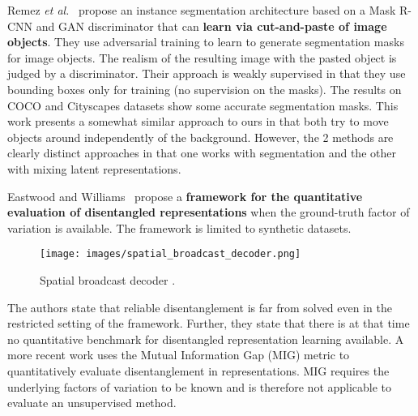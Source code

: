 \documentclass[a4paper,12pt]{report}
\begin{document}
Remez \textit{et al.}~\cite{CutAndPaste} propose an instance segmentation architecture based on a Mask R-CNN and GAN discriminator that can \textbf{learn via cut-and-paste of image objects}. They use adversarial training to learn to generate segmentation masks for image objects. The realism of the resulting image with the pasted object is judged by a discriminator. Their approach is weakly supervised in that they use bounding boxes only for training (no supervision on the masks). The results on COCO and Cityscapes datasets show some accurate segmentation masks. This work presents a somewhat similar approach to ours in that both try to move objects around independently of the background. However, the 2 methods are clearly distinct approaches in that one works with segmentation and the other with mixing latent representations.

\par Eastwood and Williams~\cite{FwkQuantEvalDisRep} propose a \textbf{framework for the quantitative evaluation of disentangled representations} when the ground-truth factor of variation is available. The framework is limited to synthetic datasets. 
\begin{wrapfigure}{r}{0.4\textwidth}
\texttt{[image: images/spatial\_broadcast\_decoder.png]} 
\caption{Spatial broadcast decoder \cite{SpatialBDecoder}.}
\label{fig:sbd}
\end{wrapfigure}
The authors state that reliable disentanglement is far from solved even in the restricted setting of the framework. Further, they state that there is at that time no quantitative benchmark for disentangled representation learning available. A more recent work \cite{SpatialBDecoder} uses the Mutual Information Gap (MIG) metric to quantitatively evaluate disentanglement in representations. MIG requires the underlying factors of variation to be known and is therefore not applicable to evaluate an unsupervised method.
\end{document}
